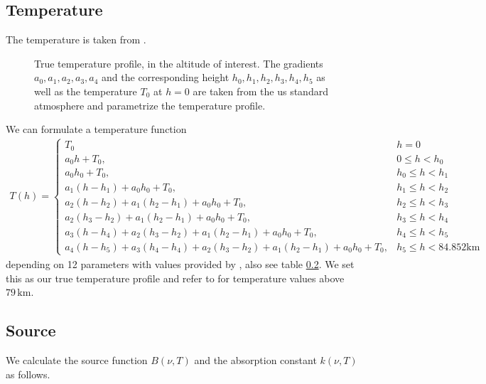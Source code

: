 \subsection{Temperature}
The temperature is taken from \cite{}.
\begin{figure}[ht!]
	\centering
	\caption{True temperature profile, in the altitude of interest.
		The gradients $a_0,a_1,a_2,a_3,a_4$ and the corresponding height $h_0,h_1,h_2,h_3,h_4,h_5$ as well as the temperature $T_0$ at $h = 0$ are taken from the us standard atmosphere and parametrize the temperature profile.}
	\label{fig:nter-label}
\end{figure}
We can formulate a temperature function
\begin{align}
	T(h) = \begin{cases*}
		T_0 & \text{$h = 0$}\\
		a_0 h  + T_0, & \text{$0 \leq h < h_{0}$}\\
		a_0 h_0  + T_0  , & \text{$h_{0} \leq  h < h_{1}$}\\
		a_1 (h -h_1)+ a_0 h_0 + T_0 , & \text{$h_{1} \leq h < h_{2}$}\\
		a_2 (h -h_2) + a_1 (h_2 - h_1) + a_0 h_0  + T_0, & \text{$h_{2} \leq h < h_{3}$}\\
		a_2  (h_3 - h_2) +  a_1 (h_2 - h_1) + a_0 h_0 + T_0, & \text{$h_{3} \leq h < h_{4}$}\\
		a_3 (h -h_4) + a_2  (h_3 - h_2) + a_1 (h_2 - h_1)+ a_0 h_0 + T_0, & \text{$h_{4} \leq h < h_{5}$}\\
		a_4 (h -h_5) + a_3 (h_4 - h_4)+ a_2  (h_3 - h_2) + a_1 (h_2 - h_1)+ a_0 h_0 + T_0, & \text{$h_{5} \leq h < 84.852\text{km}$}
	\end{cases*} 
\end{align}
depending on 12 parameters with values provided by \cite{}, also see table \ref{}.
We set this as our true temperature profile and refer to \cite{} for temperature values above $79 \,\text{km}$.


\subsection{Source}
We calculate the source function $B(\nu, T)$ and the absorption constant $ k(\nu, T)$ as follows.

